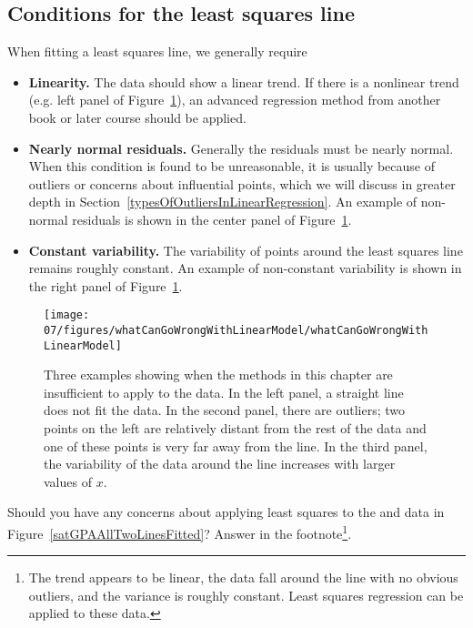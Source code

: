 \subsection{Conditions for the least squares line}

When fitting a least squares line, we generally require
\begin{itemize}
\item \textbf{Linearity.} The data should show a linear trend. If there is a nonlinear trend (e.g. left panel of Figure~\ref{whatCanGoWrongWithLinearModel}), an advanced regression method from another book or later course should be applied.
\item \textbf{Nearly normal residuals.} Generally the residuals must be nearly normal.
When this condition is found to be unreasonable, it is usually because of outliers or concerns about influential points, which we  will discuss in greater depth in Section~\ref{typesOfOutliersInLinearRegression}. An example of non-normal residuals is shown in the center panel of Figure~\ref{whatCanGoWrongWithLinearModel}.
\item \textbf{Constant variability.} The variability of points around the least squares line remains roughly constant. An example of non-constant variability is shown in the right panel of Figure~\ref{whatCanGoWrongWithLinearModel}.
\end{itemize}
\begin{figure}
\centering
\texttt{[image: 07/figures/whatCanGoWrongWithLinearModel/whatCanGoWrongWithLinearModel]}
\caption{Three examples showing when the methods in this chapter are insufficient to apply to the data. In the left panel, a straight line does not fit the data. In the second panel, there are outliers; two points on the left are relatively distant from the rest of the data and one of these points is very far away from the line. In the third panel, the variability of the data around the line increases with larger values of $x$.}
\label{whatCanGoWrongWithLinearModel}
\end{figure}

\begin{exercise}
Should you have any concerns about applying least squares to the  and  data in Figure~\vref{satGPAAllTwoLinesFitted}? Answer in the footnote\footnote{The trend appears to be linear, the data fall around the line with no obvious outliers, and the variance is roughly constant. Least squares regression can be applied to these data.}.
\end{exercise}

